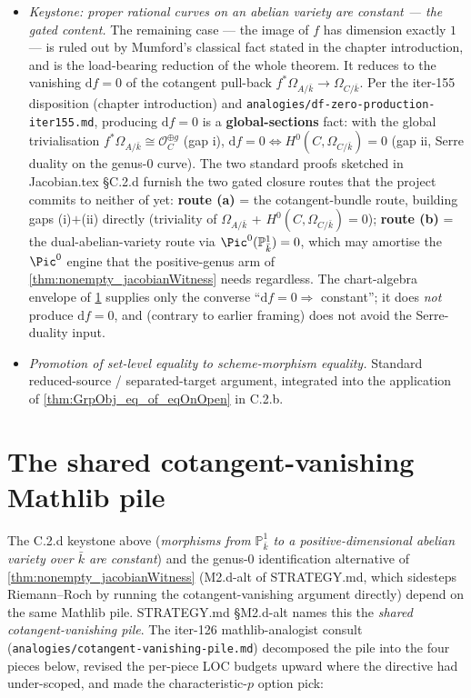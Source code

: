 \begin{itemize}
  \item[\textbf{(C.2.d)}] \emph{Keystone: proper rational curves on an abelian variety are constant --- the gated content.} The remaining case --- the image of \(f\) has dimension exactly \(1\) --- is ruled out by Mumford's classical fact stated in the chapter introduction, and is the load-bearing reduction of the whole theorem. It reduces to the vanishing \(\mathrm df = 0\) of the cotangent pull-back \(f^{*}\Omega_{A/\bar k} \to \Omega_{C/\bar k}\). Per the iter-155 disposition (chapter introduction) and \texttt{analogies/df-zero-production-iter155.md}, producing \(\mathrm df = 0\) is a \textbf{global-sections} fact: with the global trivialisation \(f^{*}\Omega_{A/\bar k} \cong \mathcal O_C^{\oplus g}\) (gap i), \(\mathrm df = 0 \iff H^0(C, \Omega_{C/\bar k}) = 0\) (gap ii, Serre duality on the genus-\(0\) curve). The two standard proofs sketched in Jacobian.tex \S C.2.d furnish the two gated closure routes that the project commits to neither of yet: \textbf{route (a)} = the cotangent-bundle route, building gaps (i)\(+\)(ii) directly (triviality of \(\Omega_{A/\bar k}\) + \(H^0(C,\Omega_{C/\bar k}) = 0\)); \textbf{route (b)} = the dual-abelian-variety route via \(\Pic^0(\mathbb P^1_{\bar k}) = 0\), which may amortise the \(\Pic^0\) engine that the positive-genus arm of \cref{thm:nonempty_jacobianWitness} needs regardless. The chart-algebra envelope of \cref{sec:RigidityKbar_shared_pile} supplies only the converse ``\(\mathrm df = 0 \Rightarrow\) constant''; it does \emph{not} produce \(\mathrm df = 0\), and (contrary to earlier framing) does not avoid the Serre-duality input.

  \item[\textbf{(C.2.e)}] \emph{Promotion of set-level equality to scheme-morphism equality.} Standard reduced-source / separated-target argument, integrated into the application of \cref{thm:GrpObj_eq_of_eqOnOpen} in C.2.b.
\end{itemize}

\section{The shared cotangent-vanishing Mathlib pile}
\label{sec:RigidityKbar_shared_pile}

The C.2.d keystone above (\emph{morphisms from \(\mathbb P^1_{\bar k}\) to a positive-dimensional abelian variety over \(\bar k\) are constant}) and the genus-\(0\) identification alternative of \cref{thm:nonempty_jacobianWitness} (M2.d-alt of STRATEGY.md, which sidesteps Riemann--Roch by running the cotangent-vanishing argument directly) depend on the same Mathlib pile. STRATEGY.md \S M2.d-alt names this the \emph{shared cotangent-vanishing pile}. The iter-126 mathlib-analogist consult (\texttt{analogies/cotangent-vanishing-pile.md}) decomposed the pile into the four pieces below, revised the per-piece LOC budgets upward where the directive had under-scoped, and made the characteristic-\(p\) option pick:


